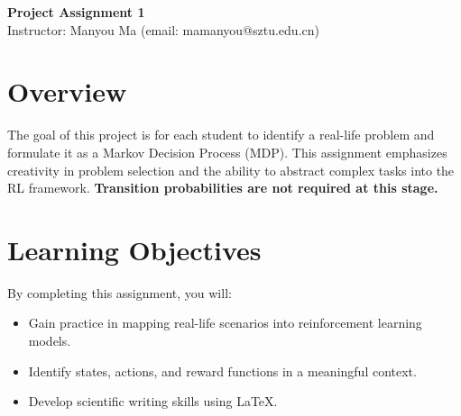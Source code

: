 \documentclass[12pt]{article}
\begin{document}
\maketitle

\begin{center}
    \vspace{1em}
    \LARGE \textbf{Project Assignment 1} \\
    \vspace{1em}
    \normalsize {Instructor: Manyou Ma \quad (email: mamanyou@sztu.edu.cn)}
\end{center}

\section{Overview}
The goal of this project is for each student to identify a real-life problem and formulate it as a Markov Decision Process (MDP). This assignment emphasizes creativity in problem selection and the ability to abstract complex tasks into the RL framework. \textbf{Transition probabilities are not required at this stage.} 

\section{Learning Objectives}
By completing this assignment, you will:
\begin{itemize}[leftmargin=*]
    \item Gain practice in mapping real-life scenarios into reinforcement learning models.
    \item Identify states, actions, and reward functions in a meaningful context.
    \item Develop scientific writing skills using \LaTeX.
\end{itemize}
\end{document}
